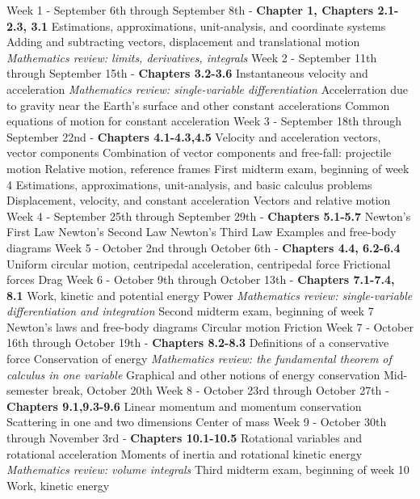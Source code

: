 \documentclass[10pt]{article}
\begin{document}
\begin{outline}[enumerate]
\1 Week 1 - September 6th through September 8th - \textbf{Chapter 1, Chapters 2.1-2.3, 3.1}
\2 Estimations, approximations, unit-analysis, and coordinate systems
\2 Adding and subtracting vectors, displacement and translational motion
\2 \textit{Mathematics review: limits, derivatives, integrals}
\1 Week 2 - September 11th through September 15th - \textbf{Chapters 3.2-3.6}
\2 Instantaneous velocity and acceleration
\3 \textit{Mathematics review: single-variable differentiation}
\2 Accelerration due to gravity near the Earth's surface and other constant accelerations
\2 Common equations of motion for constant acceleration	
\1 Week 3 - September 18th through September 22nd - \textbf{Chapters 4.1-4.3,4.5}
\2 Velocity and acceleration vectors, vector components
\2 Combination of vector components and free-fall: projectile motion
\2 Relative motion, reference frames
\1 First midterm exam, beginning of week 4
\2 Estimations, approximations, unit-analysis, and basic calculus problems
\2 Displacement, velocity, and constant acceleration
\2 Vectors and relative motion
\1 Week 4 - September 25th through September 29th - \textbf{Chapters 5.1-5.7}
\2 Newton's First Law
\2 Newton's Second Law
\2 Newton's Third Law
\2 Examples and free-body diagrams
\1 Week 5 - October 2nd through October 6th - \textbf{Chapters 4.4, 6.2-6.4}
\2 Uniform circular motion, centripedal acceleration, centripedal force
\2 Frictional forces
\2 Drag
\1 Week 6 - October 9th through October 13th - \textbf{Chapters 7.1-7.4, 8.1}
\2 Work, kinetic and potential energy
\2 Power
\3 \textit{Mathematics review: single-variable differentiation and integration}
\1 Second midterm exam, beginning of week 7
\2 Newton's laws and free-body diagrams
\2 Circular motion
\2 Friction
\1 Week 7 - October 16th through October 19th - \textbf{Chapters 8.2-8.3}
\2 Definitions of a conservative force
\2 Conservation of energy
\3 \textit{Mathematics review: the fundamental theorem of calculus in one variable}
\3 Graphical and other notions of energy conservation
\1 Mid-semester break, October 20th
\1 Week 8 - October 23rd through October 27th - \textbf{Chapters 9.1,9.3-9.6}
\2 Linear momentum and momentum conservation
\2 Scattering in one and two dimensions
\2 Center of mass
\1 Week 9 - October 30th through November 3rd - \textbf{Chapters 10.1-10.5}
\2 Rotational variables and rotational acceleration
\2 Moments of inertia and rotational kinetic energy
\3 \textit{Mathematics review: volume integrals}
\1 Third midterm exam, beginning of week 10
\2 Work, kinetic energy

\end{outline}
\end{document}
